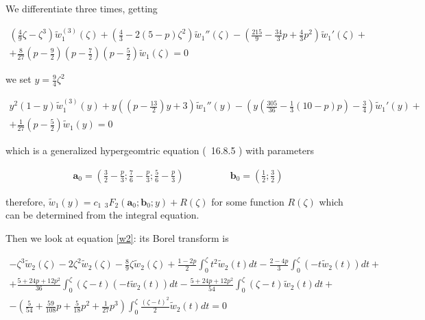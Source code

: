 \documentclass{article}
\begin{document}
We differentiate three times, getting 

\begin{multline*}
\left(\frac{4}{9}\zeta-\zeta^3\right)\tilde{w}_1^{(3)}(\zeta)+\left(\frac{4}{3}-2(5-p)\zeta^2\right)\tilde{w}_1''(\zeta)-\left(\frac{215}{9}-\frac{34}{3}p+\frac{4}{3}p^2\right)\tilde{w}_1'(\zeta)+\\
+\frac{8}{27}\left(p-\frac{9}{2}\right)\left(p-\frac{7}{2}\right)\left(p-\frac{5}{2}\right)\tilde{w}_1(\zeta)=0
\end{multline*}

we set $y=\tfrac{9}{4}\zeta^2$

\begin{multline}\label{eq:hw1}
y^2(1-y)\tilde{w}_1^{(3)}(y)+y\left(\left(p-\frac{13}{2}\right)y+3\right)\tilde{w}_1''(y)-\left(y\left(\frac{305}{36}-\frac{1}{3}(10-p)p\right)-\frac{3}{4}\right)\tilde{w}_1'(y)+\\
+\frac{1}{27}\left(p-\frac{5}{2}\right)\tilde{w}_1(y)=0
\end{multline}

which is a generalized hypergeomtric equation (~16.8.5 \cite{DLMF}) with parameters

\begin{align*}
\mathbf{a}_0=\left(\frac{3}{2}-\frac{p}{3};\frac{7}{6}-\frac{p}{3};\frac{5}{6}-\frac{p}{3}\right) & \qquad\qquad \mathbf{b}_0=\left(\frac{1}{2};\frac{3}{2}\right)
\end{align*}

therefore, $\tilde{w}_1(y)=c_1\,\,{}_3F_2\left(\mathbf{a}_0;\mathbf{b}_0;y\right)+R(\zeta)$ for some function $R(\zeta)$ which can be determined from the integral equation.

  

Then we look at equation \eqref{w2}: its Borel transform is

\begin{multline}
-\zeta^3\tilde{w}_2(\zeta)-2\zeta^2\tilde{w}_2(\zeta)-\frac{8}{9}\zeta\tilde{w}_2(\zeta)+\frac{1-2p}{2}\int_0^\zeta t^2\tilde{w}_2(t)dt-\frac{2-4p}{3}\int_0^\zeta(-t\tilde{w}_2(t))dt+\\
+\frac{5+24p+12p^2}{36}\int_0^\zeta(\zeta-t)(-t\tilde{w}_2(t))dt
-\frac{5+24p+12p^2}{54}\int_0^\zeta(\zeta-t)\tilde{w}_2(t)dt +\\
-\left(\frac{5}{54}+\frac{59}{108}p+\frac{5}{18}p^2+\frac{1}{27}p^3\right)\int_0^\zeta\frac{(\zeta-t)^2}{2}\tilde{w}_2(t)dt=0
\end{multline} 
\end{document}
